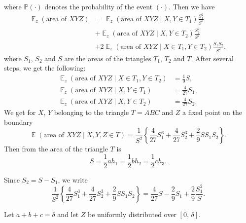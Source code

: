 \documentclass{article}
\DeclareMathOperator{\E}{\mathbb{E}}
\renewcommand{\P}{\mathbb{P}}
\begin{document}
where $\P(\cdot)$ denotes the probability of the event $(\cdot)$.
Then we have
\begin{equation}
    \begin{split}
        \E_{z}(\text{area of } XYZ) &= \E_{z}(\text{area of }XYZ\mid X, Y\in T_{1})\frac{S_{1}^{2}}{S^{2}}
        \\
        &+ \E_{z}(\text{area of }XYZ\mid X, Y\in T_{2})\frac{S_{2}^{2}}{S^{2}}
        \\
        &+ 2\E_{z}(\text{area of }XYZ\mid X\in T_{1},Y\in T_{2})\frac{S_{1}S_{2}}{S^{2}},
    \end{split}
\end{equation}
where $S_{1}$, $S_{2}$ and $S$ are the areas of the triangles $T_{1}$, $T_{2}$ and $T$.
After several steps, we get the following:
\begin{equation}
    \begin{split}
        \E_{z}(\text{area of }XYZ\mid X\in T_{1}, Y\in T_{2}) &= \frac{1}{9}S,
        \\
        \E_{z}(\text{area of }XYZ\mid X, Y\in T_{1}) &= \frac{4}{27}S_{1},
        \\
        \E_{z}(\text{area of }XYZ\mid X, Y\in T_{2}) &= \frac{4}{27}S_{2}.
    \end{split}
\end{equation}
We get for $X$, $Y$ belonging to the triangle $T = ABC$ and $Z$ a fixed point on the boundary
\begin{equation}
    \E(\text{area of } XYZ\mid X, Y, Z \in T) = \frac{1}{S^{2}}\left\{\frac{4}{27}S_{1}^{3} + \frac{4}{27}S_{2}^{3} + \frac{2}{9}SS_{1}S_{2}\right\}.
\end{equation}
Then from the area of the triangle $T$ is
\begin{equation}
    S = \frac{1}{2}ah_{1} = \frac{1}{2}bh_{2} = \frac{1}{2}ch_{3}.
\end{equation}

Since $S_{2} = S - S_{1}$, we write
\begin{equation}
    \frac{1}{S^{2}}\left\{\frac{4}{27}S_{1}^{3} + \frac{4}{27}S_{2}^{3} + \frac{2}{9}SS_{1}S_{2}\right\} = \frac{4}{27}S - \frac{2}{9}S_{1} + \frac{2}{9}\frac{S_{1}^{2}}{S}.
\end{equation}

Let $a + b + c = \delta$ and let $Z$ be uniformly distributed over $[0,\,\delta]$.
\end{document}
